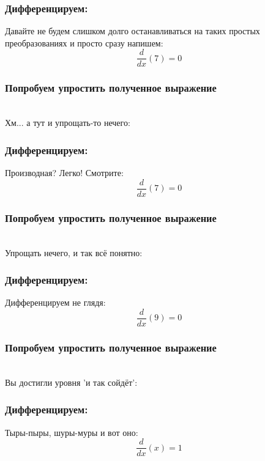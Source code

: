 \documentclass[a4paper,12pt]{article}
\begin{document}
\subsubsection*{Дифференцируем:}

Давайте не будем слишком долго останавливаться на таких простых преобразованиях и просто сразу напишем:
\begin{dmath}\frac{d}{dx}\left(7\right)=0\end{dmath}
\subsubsection*{Попробуем упростить полученное выражение}
\\Хм... а тут и упрощать-то нечего:

\subsubsection*{Дифференцируем:}

Производная? Легко! Смотрите:
\begin{dmath}\frac{d}{dx}\left(7\right)=0\end{dmath}
\subsubsection*{Попробуем упростить полученное выражение}
\\Упрощать нечего, и так всё понятно:

\subsubsection*{Дифференцируем:}

Дифференцируем не глядя:
\begin{dmath}\frac{d}{dx}\left(9\right)=0\end{dmath}
\subsubsection*{Попробуем упростить полученное выражение}
\\Вы достигли уровня 'и так сойдёт':

\subsubsection*{Дифференцируем:}

Тыры-пыры, шуры-муры и вот оно:
\begin{dmath}\frac{d}{dx}\left(x\right)=1\end{dmath}
\end{document}
